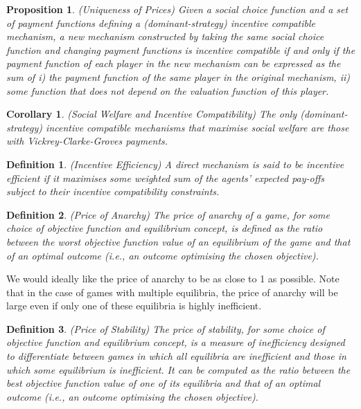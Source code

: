 \documentclass{article}
\newtheorem{proposition}{Proposition}
\newtheorem{definition}{Definition}
\newtheorem{corollary}{Corollary}
\begin{document}
\begin{proposition}
(Uniqueness of Prices) Given a social choice function and a set of payment functions defining a (dominant-strategy) incentive compatible mechanism, a new mechanism constructed by taking the same social choice function and changing payment functions is incentive compatible if and only if the payment function of each player in the new mechanism can be expressed as the sum of i) the payment function of the same player in the original mechanism, ii) some function that does not depend on the valuation function of this player.
\end{proposition}

\begin{corollary}
(Social Welfare and Incentive Compatibility) The only (dominant-strategy) incentive compatible mechanisms that maximise social welfare are those with Vickrey-Clarke-Groves payments.
\end{corollary}

\begin{definition}
(Incentive Efficiency) A direct mechanism is said to be incentive efficient if it maximises some weighted sum of the agents' expected pay-offs subject to their incentive compatibility constraints.
\end{definition}

\begin{definition}
(Price of Anarchy) The price of anarchy of a game, for some choice of objective function and equilibrium concept, is defined as the ratio between the worst objective function value of an equilibrium of the game and that of an optimal outcome (i.e., an outcome optimising the chosen objective).
\end{definition}

We would ideally like the price of anarchy to be as close to 1 as possible. Note that in the case of games with multiple equilibria, the price of anarchy will be large even if only one of these equilibria is highly inefficient. 

\begin{definition}
(Price of Stability) The price of stability, for some choice of objective function and equilibrium concept, is a measure of inefficiency designed to differentiate between games in which all equilibria are inefficient and those in which some equilibrium is inefficient. It can be computed as the ratio between the best objective function value of one of its equilibria and that of an optimal outcome (i.e., an outcome optimising the chosen objective).
\end{definition}
\end{document}
